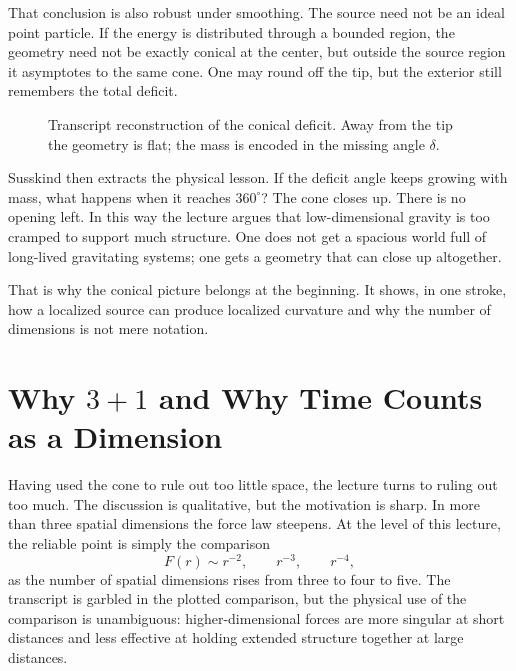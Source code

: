That conclusion is also robust under smoothing. The source need not be an ideal point particle. If the energy is distributed through a bounded region, the geometry need not be exactly conical at the center, but outside the source region it asymptotes to the same cone. One may round off the tip, but the exterior still remembers the total deficit.

\begin{figure}
\centering
{}
\caption{Transcript reconstruction of the conical deficit. Away from the tip the geometry is flat; the mass is encoded in the missing angle \(\delta\).}
\end{figure}

Susskind then extracts the physical lesson. If the deficit angle keeps growing with mass, what happens when it reaches \(360^\circ\)? The cone closes up. There is no opening left. In this way the lecture argues that low-dimensional gravity is too cramped to support much structure. One does not get a spacious world full of long-lived gravitating systems; one gets a geometry that can close up altogether.

That is why the conical picture belongs at the beginning. It shows, in one stroke, how a localized source can produce localized curvature and why the number of dimensions is not mere notation.

\section{Why \(3+1\) and Why Time Counts as a Dimension}

Having used the cone to rule out too little space, the lecture turns to ruling out too much. The discussion is qualitative, but the motivation is sharp. In more than three spatial dimensions the force law steepens. At the level of this lecture, the reliable point is simply the comparison
\begin{equation}
F(r)\sim r^{-2},\qquad r^{-3},\qquad r^{-4},
\end{equation}
as the number of spatial dimensions rises from three to four to five. The transcript is garbled in the plotted comparison, but the physical use of the comparison is unambiguous: higher-dimensional forces are more singular at short distances and less effective at holding extended structure together at large distances.

